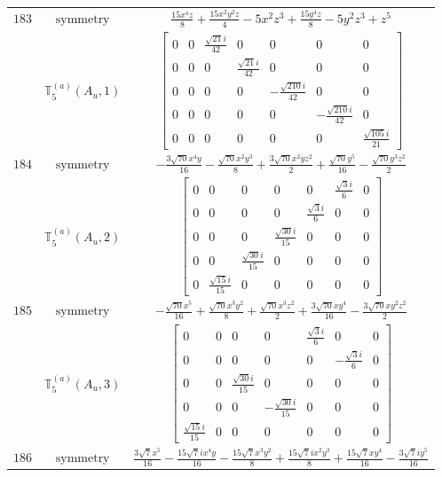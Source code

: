 \documentclass[fleqn,8pt,landscape]{jsarticle}
\begin{document}
\begin{longtable}{ccc}
$ 183 $ & $ \text{symmetry} $ & $ \frac{15 x^{4} z}{8} + \frac{15 x^{2} y^{2} z}{4} - 5 x^{2} z^{3} + \frac{15 y^{4} z}{8} - 5 y^{2} z^{3} + z^{5} $ \\
$  $ & $ \mathbb{T}_{5}^{(a)}(A_{u},1) $ & $ \begin{bmatrix} 0 & 0 & \frac{\sqrt{21} i}{42} & 0 & 0 & 0 & 0 \\ 0 & 0 & 0 & \frac{\sqrt{21} i}{42} & 0 & 0 & 0 \\ 0 & 0 & 0 & 0 & - \frac{\sqrt{210} i}{42} & 0 & 0 \\ 0 & 0 & 0 & 0 & 0 & - \frac{\sqrt{210} i}{42} & 0 \\ 0 & 0 & 0 & 0 & 0 & 0 & \frac{\sqrt{105} i}{21} \end{bmatrix} $ \\ \hline
$ 184 $ & $ \text{symmetry} $ & $ - \frac{3 \sqrt{70} x^{4} y}{16} - \frac{\sqrt{70} x^{2} y^{3}}{8} + \frac{3 \sqrt{70} x^{2} y z^{2}}{2} + \frac{\sqrt{70} y^{5}}{16} - \frac{\sqrt{70} y^{3} z^{2}}{2} $ \\
$  $ & $ \mathbb{T}_{5}^{(a)}(A_{u},2) $ & $ \begin{bmatrix} 0 & 0 & 0 & 0 & 0 & \frac{\sqrt{3} i}{6} & 0 \\ 0 & 0 & 0 & 0 & \frac{\sqrt{3} i}{6} & 0 & 0 \\ 0 & 0 & 0 & \frac{\sqrt{30} i}{15} & 0 & 0 & 0 \\ 0 & 0 & \frac{\sqrt{30} i}{15} & 0 & 0 & 0 & 0 \\ 0 & \frac{\sqrt{15} i}{15} & 0 & 0 & 0 & 0 & 0 \end{bmatrix} $ \\ \hline
$ 185 $ & $ \text{symmetry} $ & $ - \frac{\sqrt{70} x^{5}}{16} + \frac{\sqrt{70} x^{3} y^{2}}{8} + \frac{\sqrt{70} x^{3} z^{2}}{2} + \frac{3 \sqrt{70} x y^{4}}{16} - \frac{3 \sqrt{70} x y^{2} z^{2}}{2} $ \\
$  $ & $ \mathbb{T}_{5}^{(a)}(A_{u},3) $ & $ \begin{bmatrix} 0 & 0 & 0 & 0 & \frac{\sqrt{3} i}{6} & 0 & 0 \\ 0 & 0 & 0 & 0 & 0 & - \frac{\sqrt{3} i}{6} & 0 \\ 0 & 0 & \frac{\sqrt{30} i}{15} & 0 & 0 & 0 & 0 \\ 0 & 0 & 0 & - \frac{\sqrt{30} i}{15} & 0 & 0 & 0 \\ \frac{\sqrt{15} i}{15} & 0 & 0 & 0 & 0 & 0 & 0 \end{bmatrix} $ \\ \hline
$ 186 $ & $ \text{symmetry} $ & $ \frac{3 \sqrt{7} x^{5}}{16} - \frac{15 \sqrt{7} i x^{4} y}{16} - \frac{15 \sqrt{7} x^{3} y^{2}}{8} + \frac{15 \sqrt{7} i x^{2} y^{3}}{8} + \frac{15 \sqrt{7} x y^{4}}{16} - \frac{3 \sqrt{7} i y^{5}}{16} $ \\

\end{longtable}
\end{document}
